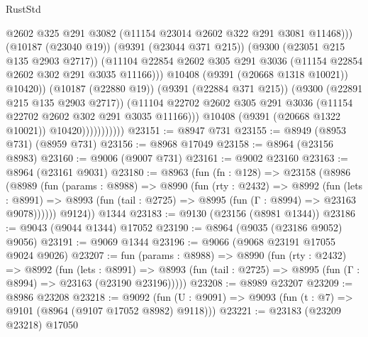 \begin{lexlean}{RustStd}
\begin{coremodule}
                                      @2602
                                      @325
                                      @291
                                      @3082
                                      (@11154 @23014 @2602 @322 @291 @3081 @11468)))
                                  (@10187 (@23040 @19))
                                  (@9391 (@23044 @371 @215))
                                  (@9300 (@23051 @215 @135 @2903 @2717))
                                  (@11104
                                    @22854
                                    @2602
                                    @305
                                    @291
                                    @3036
                                    (@11154 @22854 @2602 @302 @291 @3035 @11166)))
                                @10408
                                (@9391 (@20668 @1318 @10021))
                                @10420))
                            (@10187 (@22880 @19))
                            (@9391 (@22884 @371 @215))
                            (@9300 (@22891 @215 @135 @2903 @2717))
                            (@11104
                              @22702
                              @2602
                              @305
                              @291
                              @3036
                              (@11154 @22702 @2602 @302 @291 @3035 @11166)))
                          @10408
                          (@9391 (@20668 @1322 @10021))
                          @10420)))))))))))
@23151 := @8947 @731
@23155 := @8949 (@8953 @731) (@8959 @731)
@23156 := @8968 @17049
@23158 := @8964 (@23156 @8983)
@23160 := @9006 (@9007 @731)
@23161 := @9002 @23160
@23163 := @8964 (@23161 @9031)
@23180 := @8963
    (fun (fn : @128) =>
    @23158
      (@8986
        (@8989
          (fun (params : @8988) =>
          @8990
            (fun (rty : @2432) =>
            @8992
              (fun (lets : @8991) =>
              @8993 (fun (tail : @2725) => @8995 (fun (Γ : @8994) => @23163 @9078))))))
        @9124))
    @1344
@23183 := @9130 (@23156 (@8981 @1344))
@23186 := @9043 (@9044 @1344) @17052
@23190 := @8964 (@9035 (@23186 @9052) @9056)
@23191 := @9069 @1344
@23196 := @9066 (@9068 @23191 @17055 @9024 @9026)
@23207 := fun (params : @8988) =>
  @8990
    (fun (rty : @2432) =>
    @8992
      (fun (lets : @8991) =>
      @8993 (fun (tail : @2725) => @8995 (fun (Γ : @8994) => @23163 (@23190 @23196)))))
@23208 := @8989 @23207
@23209 := @8986 @23208
@23218 := @9092
    (fun (U : @9091) => @9093 (fun (t : @7) => @9101 (@8964 (@9107 @17052 @8982) @9118)))
@23221 := @23183 (@23209 @23218) @17050

\end{coremodule}
\end{lexlean}
